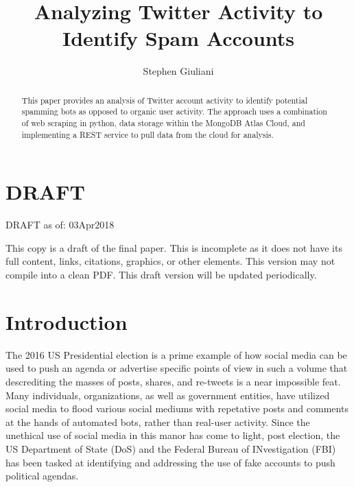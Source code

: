 
\title{Analyzing Twitter Activity to Identify Spam Accounts}


\author{Stephen Giuliani}

\renewcommand{\shortauthors}{S. Giuliani}


\begin{abstract}
This paper provides an analysis of Twitter account activity to identify potential spamming bots as opposed to organic user activity. The approach uses a combination of web scraping in python, data storage within the MongoDB Atlas Cloud, and implementing a REST service to pull data from the cloud for analysis.
\end{abstract}



\maketitle

\section{DRAFT}

DRAFT as of: 03Apr2018

This copy is a draft of the final paper. This is incomplete as it does not have its full content, links, citations, graphics, or other elements. This version may not compile into a clean PDF. This draft version will be updated periodically.

\section{Introduction}

The 2016 US Presidential election is a prime example of how social media can be used to push an agenda or advertise specific points of view in such a volume that descrediting the masses of posts, shares, and re-tweets is a near impossible feat. Many individuals, organizations, as well as government entities, have utilized social media to flood various social mediums with repetative posts and comments at the hands of automated bots, rather than real-user activity. Since the unethical use of social media in this manor has come to light, post election, the US Department of State (DoS) and the Federal Bureau of INvestigation (FBI) has been tasked at identifying and addressing the use of fake accounts to push political agendas.

